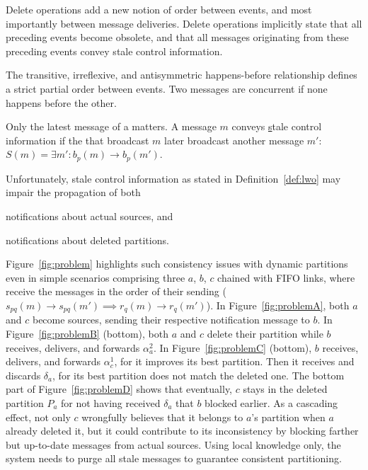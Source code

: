 Delete operations add a new notion of order between events, and most
importantly between message deliveries. Delete operations implicitly
state that all preceding events become obsolete, and that all messages
originating from these preceding events convey stale control
information.



\begin{definition}
  The transitive, irreflexive, and antisymmetric happens-before
  relationship defines a strict partial order between events. Two
  messages are concurrent if none happens before the other.
\end{definition}

\begin{definition}
  Only the latest message of a \process matters. A message $m$ conveys
  \underline{s}tale control information if the \process that broadcast
  $m$ later broadcast another message $m'$: $S(m) = \exists m': b_p(m)
  \rightarrow b_p(m')$.

\end{definition}

Unfortunately, stale control information as stated in
Definition~\ref{def:lwo} may impair the propagation of both
\begin{inparaenum}[(i)]
\item notifications about actual sources, and
\item notifications about deleted partitions.
\end{inparaenum}
Figure~\ref{fig:problem} highlights such consistency issues with
dynamic partitions even in simple scenarios comprising three
\processes $a$, $b$, $c$ chained with FIFO links, \ie where \processes
receive the messages in the order of their sending ($s_{pq}(m)
\rightarrow s_{pq}(m') \implies r_q(m) \rightarrow r_q(m')$). In
Figure~\ref{fig:problemA}, both $a$ and $c$ become sources, sending
their respective notification message to $b$. In
Figure~\ref{fig:problemB} (bottom), both $a$ and $c$ delete their
partition while $b$ receives, delivers, and forwards $\alpha_a^2$. In
Figure~\ref{fig:problemC} (bottom), $b$ receives, delivers, and
forwards $\alpha_c^1$, for it improves its best partition. Then it
receives and discards $\delta_a$, for its best partition does not
match the deleted one. The bottom part of Figure~\ref{fig:problemD}
shows that eventually, $c$ stays in the deleted partition $P_a$ for
not having received $\delta_a$ that $b$ blocked earlier. As a
cascading effect, not only $c$ wrongfully believes that it belongs to
$a$'s partition when $a$ already deleted it, but it could contribute
to its inconsistency by blocking farther but up-to-date messages from
actual sources. Using local knowledge only, the system needs to purge
all stale messages to guarantee consistent partitioning.

